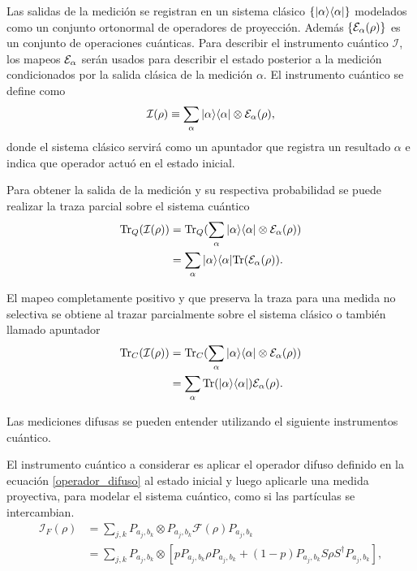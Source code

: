 Las salidas de la medición se registran en un sistema clásico $\{|\alpha\rangle \langle
\alpha |\}$ modelados como un conjunto ortonormal de operadores de proyección.
Además $\{\mathcal{E}_\alpha(\rho)\}$ es un conjunto de operaciones cuánticas. Para
describir el instrumento cuántico $\mathcal{I}$, los mapeos $\mathcal{E}_\alpha$ serán
usados para describir  el estado posterior a la medición condicionados por la
salida clásica de la medición $\alpha$. El instrumento cuántico se define
como
\begin{equation}
    \mathcal{I}(\rho)\equiv\sum_\alpha |\alpha\rangle \langle\alpha|\otimes \mathcal{E}_\alpha(\rho),
\end{equation}
donde el sistema clásico servirá como un apuntador que registra un resultado
$\alpha$ e indica que operador actuó en el estado inicial.



Para obtener la salida de la medición y su respectiva probabilidad se puede
realizar la traza parcial sobre el sistema cuántico \begin{equation}
    \begin{split}
        {\rm Tr}_Q(\mathcal{I}(\rho))&={\rm Tr}_Q(\sum_\alpha |\alpha\rangle \langle\alpha|\otimes \mathcal{E}_\alpha(\rho))\\
        &=\sum_\alpha |\alpha\rangle \langle\alpha|{\rm Tr}(\mathcal{E}_\alpha(\rho)).
    \end{split}
\end{equation}

El mapeo completamente positivo y que preserva la traza para una medida no selectiva se obtiene al trazar parcialmente sobre el sistema clásico o también llamado apuntador\begin{equation}
    \begin{split}
        {\rm Tr}_C(\mathcal{I}(\rho))&={\rm Tr}_C(\sum_\alpha |\alpha\rangle \langle\alpha|\otimes \mathcal{E}_\alpha(\rho))\\
        &=\sum_\alpha {\rm Tr}(|\alpha\rangle \langle\alpha|)\mathcal{E}_\alpha(\rho).
    \end{split}
\end{equation}

Las mediciones difusas se pueden entender utilizando el siguiente instrumentos cuántico. 



El instrumento cuántico a considerar es aplicar el operador difuso definido en la ecuación {\ref{operador_difuso}} al estado inicial y luego aplicarle una medida proyectiva, para modelar el sistema cuántico, como  si las partículas se intercambian.\begin{equation}
    \begin{split}
        \mathcal{I}_F(\rho)&=\sum_{j,k}P_{a_j,b_k}\otimes P_{a_j,b_k} \mathcal{F}(\rho) P_{a_j,b_k}\\
        &=\sum_{j,k}P_{a_j,b_k}\otimes[p P_{a_j,b_k}\rho P_{a_j,b_k}+(1-p)P_{a_j,b_k}S\rho S^\dagger P_{a_j,b_k}],
\end{split}
\end{equation}

